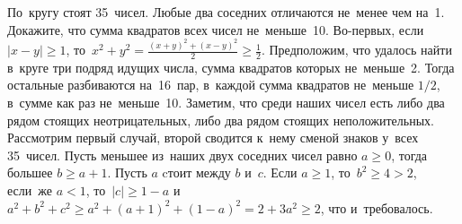 \problem{}
По~кругу стоят 35~чисел.
Любые два соседних отличаются не~менее чем на~1.
Докажите, что сумма квадратов всех чисел не~меньше~10.
\solution
Во-первых, если $|x - y| \geq 1$,
то~$x^2 + y^2 = \frac{(x + y)^2 + (x - y)^2}{2} \geq \frac{1}{2}$.
Предположим, что удалось найти в~круге три подряд идущих числа, сумма квадратов
которых не~меньше~2.
Тогда остальные разбиваются на~16~пар, в~каждой сумма квадратов не~меньше
$1/2$, в~сумме как раз не~меньше~10.
Заметим, что среди наших чисел есть либо два рядом стоящих неотрицательных,
либо два рядом стоящих неположительных.
Рассмотрим первый случай, второй сводится к~нему сменой знаков у~всех 35~чисел.
Пусть меньшее из~наших двух соседних чисел равно $a \geq 0$, тогда большее
$b \geq a + 1$.
Пусть $a$ cтоит между $b$ и~$c$.
Если $a \geq 1$, то~$b^2 \geq 4 > 2$, если~же $a < 1$, то~$|c| \geq 1 - a$
и~\(
    a^2 + b^2 + c^2
\geq
    a^2 + (a + 1)^2 + (1 - a)^2
=
    2 + 3 a^2 \geq 2
\),
что и~требовалось.
\endproblem
